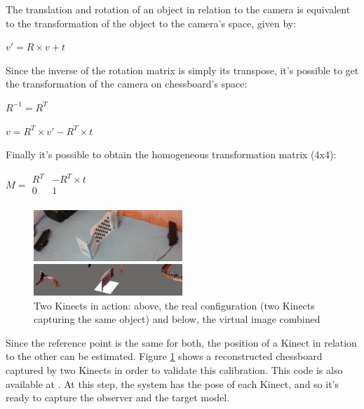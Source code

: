 \documentclass[msc, a4paper, classic, en]{ufbathesis}
\begin{document}
The translation and rotation of an object in relation to the camera is equivalent to the transformation of the object to the camera's space, given by:

\begin{center}
$v' = R \times v + t$
\end{center}

Since the inverse of the rotation matrix is simply its transpose, it's possible to get the transformation of the camera on chessboard's space:

\begin{center}
$R^{-1} = R^{T}$
\end{center}

\begin{center}
$v = R^T \times v' - R^T \times t$
\end{center}

Finally it's possible to obtain the homogeneous transformation matrix (4x4):

\begin{center}
$M = \begin{matrix}
    R^T & -R^T \times t \\
    0 & 1 \\
    \end{matrix}$
\end{center}

\begin{figure}
\centering
\includegraphics[width=0.5\textwidth]{images/panda.png}
\caption{Two Kinects in action: above, the real configuration (two Kinects capturing the same object) and below, the virtual image combined}
\label{fig:panda}
\end{figure}

Since the reference point is the same for both, the position of a Kinect in relation to the other can be estimated. Figure \ref{fig:panda} shows a reconstructed chessboard captured by two Kinects in order to validate this calibration. This code is also available at \cite{masterproject}. At this step, the system has the pose of each Kinect, and so it's ready to capture the observer and the target model.
\end{document}
